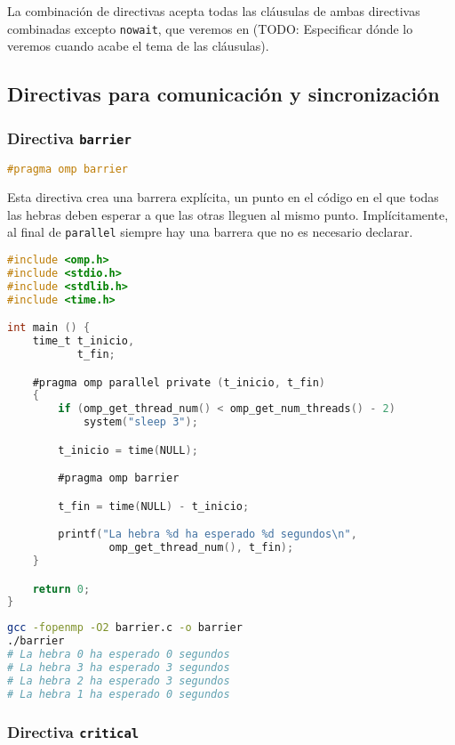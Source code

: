 La combinación de directivas acepta todas las cláusulas de ambas directivas combinadas excepto \texttt{nowait}, que veremos en (TODO\@: Especificar dónde lo veremos cuando acabe el tema de las cláusulas).

\subsection{Directivas para comunicación y sincronización}\label{directivas-openmp-directivas}

\subsubsection{Directiva \texttt{barrier}}

\begin{lstlisting}[language=C]
#pragma omp barrier
\end{lstlisting}

Esta directiva crea una barrera explícita, un punto en el código en el que todas las hebras deben esperar a que las otras lleguen al mismo punto.
Implícitamente, al final de \texttt{parallel} siempre hay una barrera que no es necesario declarar.

\begin{lstlisting}[language=C]
#include <omp.h>
#include <stdio.h>
#include <stdlib.h>
#include <time.h>

int main () {
	time_t t_inicio,
	       t_fin;

	#pragma omp parallel private (t_inicio, t_fin)
	{
		if (omp_get_thread_num() < omp_get_num_threads() - 2)
			system("sleep 3");

		t_inicio = time(NULL);

		#pragma omp barrier

		t_fin = time(NULL) - t_inicio;

		printf("La hebra %d ha esperado %d segundos\n",
		        omp_get_thread_num(), t_fin);
	}

	return 0;
}
\end{lstlisting}

\begin{lstlisting}[language=sh]
gcc -fopenmp -O2 barrier.c -o barrier
./barrier
# La hebra 0 ha esperado 0 segundos
# La hebra 3 ha esperado 3 segundos
# La hebra 2 ha esperado 3 segundos
# La hebra 1 ha esperado 0 segundos
\end{lstlisting}

\subsubsection{Directiva \texttt{critical}}

